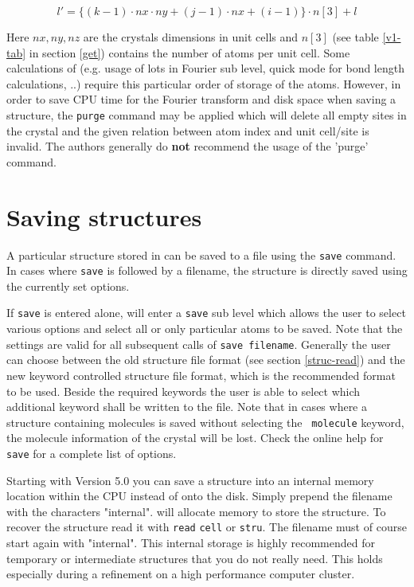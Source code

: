 \begin{equation}
        l' = \{ (k-1) \cdot nx \cdot ny +
                (j-1) \cdot nx +
                (i-1) \} \cdot n[3] + l
        \label{struc-store-eq}
\end{equation}

Here $nx,ny,nz$ are the crystals dimensions in unit cells and $n[3]$
(see table \ref{v1-tab} in section \ref{get}) contains the number 
of atoms per unit cell.
Some calculations of \Discus (e.g.  usage of lots in Fourier
sub level, quick mode for bond length calculations, ..) require this
particular order of storage of the atoms.  However, in order to save
CPU time for the Fourier transform and disk space when saving a
structure, the {\tt purge} command may be applied which will delete
all empty sites in the crystal and the given relation between atom
index and unit cell/site is invalid.  The authors generally do {\bf
not} recommend the usage of the 'purge' command.


\section{Saving structures \label{struc-save}}

A particular structure stored in \Discus can be saved to a file
using the {\tt save} command. In cases where {\tt save} is followed
by a filename, the structure is directly saved using the currently
set options. \par

If {\tt save} is entered alone, \Discus will enter a {\tt save}
sub level which allows the user to select various options and select
all or only particular atoms to be saved. Note that the settings are
valid for all subsequent calls of {\tt save filename}. Generally the
user can choose between the old structure file format (see section
\ref{struc-read}) and the new keyword controlled structure file
format, which is the recommended format to be used. Beside the
required keywords the user is able to select which additional
keyword shall be written to the file. Note that in cases where a
structure containing molecules is saved without selecting the {\tt
molecule} keyword, the molecule information of the crystal will be
lost. Check the online help for {\tt save} for a complete list of
options.

Starting with \Discus Version 5.0 you can save a structure into
an internal memory location within the CPU instead of onto the disk.
Simply prepend the filename with the characters "internal". \Discus
will allocate memory to store  the structure. To recover the structure
read it with {\tt read} {\tt cell} or {\tt stru}. The filename must
of course start again with "internal". This internal storage is highly
recommended for temporary or intermediate structures that you do not 
really need. This holds especially during a refinement on a high 
performance computer cluster.

